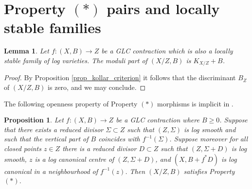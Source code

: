 \documentclass[12pt]{amsart}
\theoremstyle{plain}
\newtheorem{lemma}[theorem]{Lemma}
\newtheorem{proposition}[theorem]{Proposition}
\theoremstyle{definition}
\begin{document}


\section{Property $(*)$ pairs and locally stable families}






\begin{lemma}
\label{lem_mod_part_stable}
Let $f\colon (X, B) \rightarrow Z$ be a GLC contraction which is also a 
locally stable family of log varieties.
The moduli part of $(X/Z, B)$
is $K_{X/Z}+B$. 
\end{lemma}
\begin{proof}
By Proposition \ref{prop_kollar_criterion}
it follows that the discriminant $B_{Z}$ of $(X/Z, B)$ 
is zero, and we may conclude.
\end{proof}

The following openness property of Property $(*)$ morphisms is implicit in \cite{ACSS}.

\begin{proposition}
\label{prop_property*_open}
Let $f\colon (X, B) \rightarrow Z$ be a GLC contraction where $B \geq 0$. 
Suppose that there exists a reduced divisor $\Sigma \subset Z$ such that 
$(Z, \Sigma)$ is log smooth and such that the vertical part of $B$ coincides with 
$f^{-1}(\Sigma)$.
Suppose moreover for all closed points $z \in Z$ there is a 
reduced divisor $D \subset Z$ such that $(Z, \Sigma+D)$ is log smooth, 
$z$ is a log canonical centre of $(Z, \Sigma+D)$, and $(X, B+f^*D)$ 
is log canonical in a neighbourhood of $f^{-1}(z)$.
Then $(X/Z, B)$ satisfies Property $(*)$.
\end{proposition}
\end{document}
